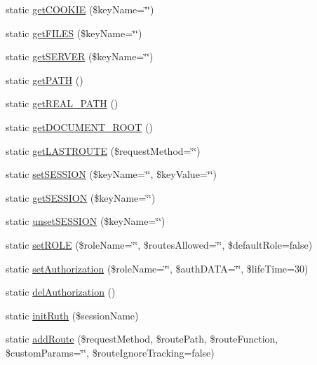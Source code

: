 \begin{DoxyCompactItemize}
\item 
static \hyperlink{classRuth_a5ec6c65c94d056a2e0705efaa56f7660}{get\+C\+O\+O\+K\+I\+E} (\$key\+Name=\char`\"{}\char`\"{})
\item 
static \hyperlink{classRuth_a12be6f40ae06f4443848d0f8a089bd00}{get\+F\+I\+L\+E\+S} (\$key\+Name=\char`\"{}\char`\"{})
\item 
static \hyperlink{classRuth_ab868231ae3b29da9c9456d0b866dc8ec}{get\+S\+E\+R\+V\+E\+R} (\$key\+Name=\char`\"{}\char`\"{})
\item 
static \hyperlink{classRuth_abbbe520ef7554c895ab5f4213b8738a3}{get\+P\+A\+T\+H} ()
\item 
static \hyperlink{classRuth_a258953d4afe38d92f4be70313d500d40}{get\+R\+E\+A\+L\+\_\+\+P\+A\+T\+H} ()
\item 
static \hyperlink{classRuth_a0801b3a28f3385eeee817a3deb14b028}{get\+D\+O\+C\+U\+M\+E\+N\+T\+\_\+\+R\+O\+O\+T} ()
\item 
static \hyperlink{classRuth_a692691e58b9b2fce80e0bed5a3207137}{get\+L\+A\+S\+T\+R\+O\+U\+T\+E} (\$request\+Method=\char`\"{}\char`\"{})
\item 
static \hyperlink{classRuth_a4a88a74e5af0a0155eb3fe438ad995c3}{set\+S\+E\+S\+S\+I\+O\+N} (\$key\+Name=\char`\"{}\char`\"{}, \$key\+Value=\char`\"{}\char`\"{})
\item 
static \hyperlink{classRuth_a0960ac91d1a1ce9c7cb3324ee51f4d74}{get\+S\+E\+S\+S\+I\+O\+N} (\$key\+Name=\char`\"{}\char`\"{})
\item 
static \hyperlink{classRuth_a4f4e6184de654b141a679146e35f8f59}{unset\+S\+E\+S\+S\+I\+O\+N} (\$key\+Name=\char`\"{}\char`\"{})
\item 
static \hyperlink{classRuth_a169d4a654420b5abce66787cc8cb51b4}{set\+R\+O\+L\+E} (\$role\+Name=\char`\"{}\char`\"{}, \$routes\+Allowed=\char`\"{}\char`\"{}, \$default\+Role=false)
\item 
static \hyperlink{classRuth_a2cbe3cd7c0d3dfadac54a6020d075607}{set\+Authorization} (\$role\+Name=\char`\"{}\char`\"{}, \$auth\+D\+A\+T\+A=\char`\"{}\char`\"{}, \$life\+Time=30)
\item 
static \hyperlink{classRuth_af751cee7c3766c478a09ea14ffc5ce99}{del\+Authorization} ()
\item 
static \hyperlink{classRuth_a2ce840061c470dee079816ec54bfc1f4}{init\+Ruth} (\$session\+Name)
\item 
static \hyperlink{classRuth_ad13bc87f60f8b74efd4c784fa2c49288}{add\+Route} (\$request\+Method, \$route\+Path, \$route\+Function, \$custom\+Params=\char`\"{}\char`\"{}, \$route\+Ignore\+Tracking=false)

\end{DoxyCompactItemize}
